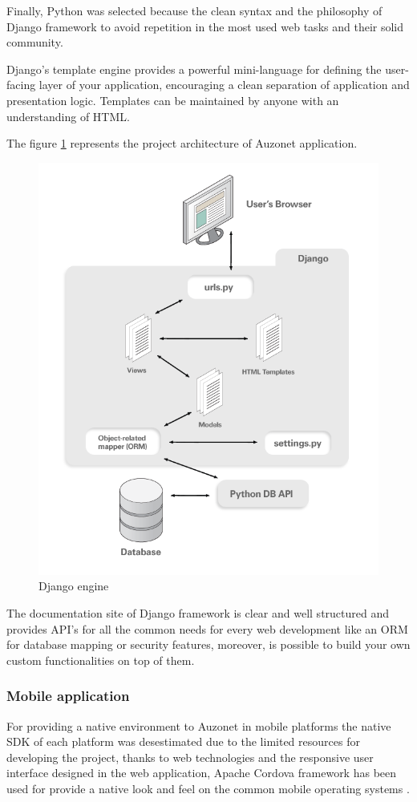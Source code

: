 \documentclass{DeustoFDP}
\begin{document}
Finally, Python was selected because the clean syntax and the philosophy of Django framework to avoid repetition in the most used web tasks and their solid community.

Django’s template engine provides a powerful mini-language for defining the user-facing layer of your application, encouraging a clean separation of application and presentation logic. Templates can be maintained by anyone with an understanding of HTML.

The figure \ref{fig:djangoarchitecture} represents the project architecture of Auzonet application.

\begin{figure}[h!]
\centering
\includegraphics[width=0.9\linewidth]{fig/djangoarchitecture}
\caption[Django engine]{Django engine}
\label{fig:djangoarchitecture}
\end{figure}


The documentation site of Django framework \cite{Djangodocs} is clear and well structured and provides API's for all the common needs for every web development like an ORM for database mapping or security features, moreover, is possible to build your own custom functionalities on top of them.
\newpage
\subsubsection{Mobile application}
For providing a native environment to Auzonet in mobile platforms the native SDK of each platform was desestimated due to the limited resources for developing the project, thanks to web technologies and the responsive user interface designed in the web application, Apache Cordova framework has been used for provide a native look and feel on the common mobile operating systems \cite{convertingwebapps}.
\end{document}
